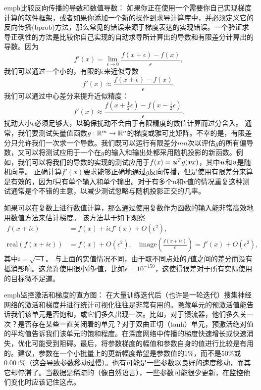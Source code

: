 emph{比较反向传播的导数和数值导数}：
如果你正在使用一个需要你自己实现梯度计算的软件框架，或者如果你添加一个新的操作到求导计算库中，并必须定义它的反向传播(bprob)方法，那么常见的错误来源于梯度表达的实现错误。一个验证求导正确性的方法是比较你自己实现的自动求导所计算出的导数和有限差分计算出的导数。因为
\begin{equation}
    f'(x) = \lim_{\epsilon \to 0} \frac{f(x+\epsilon) - f(x)}{\epsilon},
\end{equation}
我们可以通过一个小的，有限的$\epsilon$来近似导数
\begin{equation}
    f'(x) \approx \frac{f(x+\epsilon) - f(x)}{\epsilon}.
\end{equation}
我们可以通过中心差分来提升近似精度：
\begin{equation}
    f'(x) \approx \frac{ f(x+\frac{1}{2}\epsilon) - f(x-\frac{1}{2}\epsilon) }{\epsilon}.
\end{equation}
扰动大小$\epsilon$必须足够大，以确保扰动不会由于有限精度的数值计算而过分舍入。
通常，我们要测试矢量值函数$g:\mathbb{R}^m \to \mathbb{R}^n$的梯度或雅可比矩阵。不幸的是，有限差分只允许我们一次求一个导数。我们既可以运行有限差分$mn$次以评估$g$的所有偏导数，又可以将测试应用于一个在$g$的输入和输出处都采用随机投影的新函数。例如，我们可以将我们的导数的实现的测试应用于$f(x) = \boldsymbol{\mathit{u}}^T g(\boldsymbol{\mathit{v}} x)$，其中$\boldsymbol{\mathit{u}}$和$\boldsymbol{\mathit{v}}$是随机向量。
正确计算$f'(x)$要求能够正确地通过$g$反向传播，但是使用有限差分来算是有效的，因为f只有单个输入和单个输出。对于有多个u和v值的情况重复这种测试通常是个不错的主意，以减少测试忽略与随机投影正交的几率。

如果可以在复数上进行数值计算，那么通过使用复数作为函数的输入能非常高效地用数值方法来估计梯度\citep{Squire+Trapp-1998}。
该方法基于如下观察
\begin{align}
    f(x + i\epsilon) &= f(x) + i\epsilon f'(x) + O(\epsilon^2) ,\\
    \text{real}( f(x+i\epsilon) ) &= f(x) + O(\epsilon^2), \quad \text{image}( \frac{f(x+i\epsilon)}{ \epsilon } ) = f'(x) + O(\epsilon^2),
\end{align}
其中$i=\sqrt{-1}$。
与上面的实值情况不同，由于取不同点处的$f$值之间的差分而没有抵消影响。这允许使用很小的$\epsilon$值，比如$\epsilon = 10^{-150}$，这使得误差对于所有实际使用的目标微不足道。

emph{监控激活和梯度的直方图}：
在大量训练迭代后（也许是一轮迭代）搜集神经网络的激活和梯度并进行统计可视化往往是非常有用的。隐藏单元的预激活值能告诉我们该单元是否饱和，或它们多久出现一次。比如，对于镇流器，他们多久关一次？是否存在某些一直关闭着的单元？对于双曲正切（tanh）单元，预激活绝对值的平均值告诉我们该单元的饱和程度。在深度网络中传播的梯度快速增长或快速消失，优化可能受到阻碍。最后，将参数梯度的幅值和参数自身的值进行比较是有用的。建议，参数在一个小批量上的更新幅度希望是参数值的$1\%$，而不是$50\%$或$0.001\%$（这会导致参数移动过慢）。也有可能是一些参数以良好的速度移动，而其它却停滞了。当数据是稀疏的（像自然语言），一些参数可能很少更新，在监控他们变化时应该记住这点。

